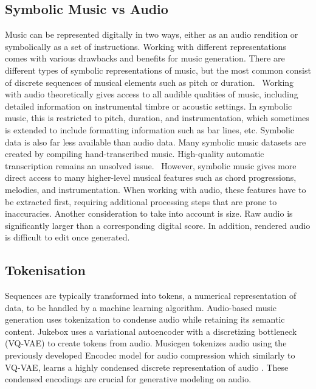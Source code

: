 \subsection{Symbolic Music vs Audio}
Music can be represented digitally in two ways, either as an audio rendition or symbolically as a set of instructions. Working with different representations comes with various drawbacks and benefits for music generation. There are different types of symbolic representations of music, but the most common consist of discrete sequences of musical elements such as pitch or duration.  Working with audio theoretically gives access to all audible qualities of music, including detailed information on instrumental timbre or acoustic settings. In symbolic music, this is restricted to pitch, duration, and instrumentation, which sometimes is extended to include formatting information such as bar lines, etc. 
Symbolic data is also far less available than audio data. Many symbolic music datasets are created by compiling hand-transcribed music. High-quality automatic transcription remains an unsolved issue.\cite{Ji_Yang_Luo_survey_symbolic_2024}\cite{Chen_Smith_Spijkervet_Wang_Zou_Li_Kong_Du_2024}  However, symbolic music gives more direct access to many higher-level musical features such as chord progressions, melodies, and instrumentation. When working with audio, these features have to be extracted first, requiring additional processing steps that are prone to inaccuracies. 
Another consideration to take into account is size. Raw audio is significantly larger than a corresponding digital score. In addition, rendered audio is difficult to edit once generated. 

\subsection{Tokenisation}
Sequences are typically transformed into tokens, a numerical representation of data, to be handled by a machine learning algorithm. Audio-based music generation uses tokenization to condense audio while retaining its semantic content. Jukebox \cite{Dhariwal_Jun_Payne_Kim_Radford_Sutskever_2020} uses a variational autoencoder\cite{Kingma_Welling_2014} with a discretizing bottleneck (VQ-VAE) to create tokens from audio. Musicgen \cite{copet2023simple} tokenizes audio using the previously developed Encodec model for audio compression which similarly to VQ-VAE, learns a highly condensed discrete representation of audio \cite{Défossez_2023_encodec}. These condensed encodings are crucial for generative modeling on audio.

